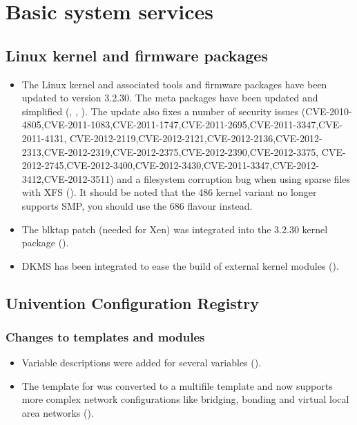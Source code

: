 \section{Basic system services}


\subsection{Linux kernel and firmware packages}
\begin{itemize}
\item The Linux kernel and associated tools and firmware packages have been updated to version 3.2.30. The meta
  packages have been updated and simplified (, , ). The update also fixes
  a number of security issues (CVE-2010-4805,CVE-2011-1083,CVE-2011-1747,CVE-2011-2695,CVE-2011-3347,CVE-2011-4131,
  CVE-2012-2119,CVE-2012-2121,CVE-2012-2136,CVE-2012-2313,CVE-2012-2319,CVE-2012-2375,CVE-2012-2390,CVE-2012-3375,
  CVE-2012-2745,CVE-2012-3400,CVE-2012-3430,CVE-2011-3347,CVE-2012-3412,CVE-2012-3511)
  and a filesystem corruption bug when using sparse files with XFS
  (). It should be noted that the 486 kernel variant no
  longer supports SMP, you should use the 686 flavour instead.
\item The blktap patch (needed for Xen) was integrated into the 3.2.30 kernel package ().
\item DKMS has been integrated to ease the build of external kernel modules ().
\end{itemize}

\subsection{Univention Configuration Registry}

\subsubsection{Changes to templates and modules}
\begin{itemize}
\item Variable descriptions were added for several variables  ().
\item The template for  was converted
  to a multifile template and now supports more complex network
  configurations like bridging, bonding and virtual local area
  networks ().
\end{itemize}

